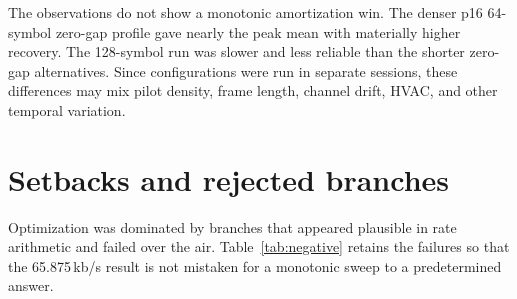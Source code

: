 \documentclass[11pt]{article}
\begin{document}
The observations do not show a monotonic amortization win. The denser p16
64-symbol zero-gap profile gave nearly the peak mean with materially higher
recovery. The 128-symbol run was slower and less reliable than the shorter
zero-gap alternatives. Since configurations were run in separate sessions,
these differences may mix pilot density, frame length, channel drift, HVAC,
and other temporal variation.

\section{Setbacks and rejected branches}
\label{sec:setbacks}

Optimization was dominated by branches that appeared plausible in rate
arithmetic and failed over the air. Table~\ref{tab:negative} retains the
failures so that the 65.875\,kb/s result is not mistaken for a monotonic sweep
to a predetermined answer.
\end{document}

